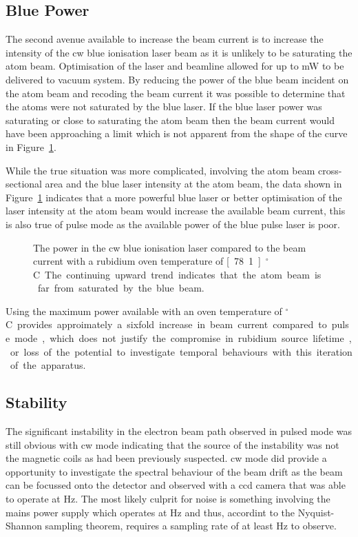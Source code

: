 \subsection{Blue Power}

The second avenue available to increase the beam current is to increase the intensity of the \gls{cw} blue ionisation laser beam as it is unlikely to be saturating the atom beam.
Optimisation of the laser and beamline allowed for up to \unit[280]{mW} to be delivered to vacuum system.
By reducing the power of the blue beam incident on the atom beam and recoding the beam current it was possible to determine that the atoms were not saturated by the blue laser.
If the blue laser power was saturating or close to saturating the atom beam then the beam current would have been approaching a limit which is not apparent from the shape of the curve in Figure~\ref{figure:blue_power}.

While the true situation was more complicated, involving the atom beam cross-sectional area and the blue laser intensity at the atom beam, the data shown in Figure~\ref{figure:blue_power} indicates that a more powerful blue laser or better optimisation of the laser intensity at the atom beam would increase the available beam current, this is also true of pulse mode as the available power of the blue pulse laser is poor.

\begin{figure}
    \center
    
    \caption{The power in the \gls{cw} blue ionisation laser compared to the beam current with a rubidium oven temperature of \unit[78.1]{$^\circ$C}.
    The continuing upward trend indicates that the atom beam is far from saturated by the blue beam.}
    \label{figure:blue_power}
\end{figure}

Using the maximum power available with an oven temperature of \unit[200]{$^\circ$C} provides approimately a sixfold increase in beam current compared to pulse mode, which does not justify the compromise in rubidium source lifetime, or loss of the potential to investigate temporal behaviours with this iteration of the apparatus.

\subsection{Stability}\label{section:stability}

The significant instability in the electron beam path observed in pulsed mode was still obvious with \gls{cw} mode indicating that the source of the instability was not the magnetic coils as had been previously suspected.
\Gls{cw} mode did provide a opportunity to investigate the spectral behaviour of the beam drift as the beam can be focussed onto the detector and observed with a \gls{ccd} camera that was able to operate at \unit[240]{Hz}.
The most likely culprit for noise is something involving the mains power supply which operates at \unit[50]{Hz} and thus, accordint to the Nyquist-Shannon sampling theorem, requires a sampling rate of at least \unit[100]{Hz} to observe.

